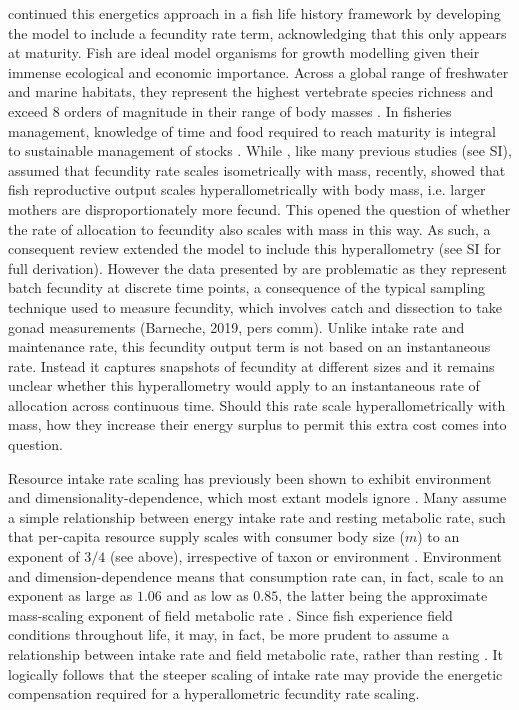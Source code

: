 \documentclass[a4paper]{article} %
\begin{document}
    \textcite{Charnov2001} continued this energetics approach in a fish life history framework by developing the \textcite{West2001} model to include a fecundity rate term, acknowledging that this only appears at maturity. Fish are ideal model organisms for growth modelling given their immense ecological and economic importance. Across a global range of freshwater and marine habitats, they represent the highest vertebrate species richness and exceed 8 orders of magnitude in their range of body masses \autocite{Barneche2018c}. In fisheries management, knowledge of time and food required to reach maturity is integral to sustainable management of stocks \autocite{Szuwalski2017, Barneche2018c}.
    While \textcite{Charnov2001}, like many previous studies (see SI), assumed that fecundity rate scales isometrically with mass, recently, \textcite{Barneche2018-reproductive_output} showed that fish reproductive output scales hyperallometrically with body mass, i.e. larger mothers are disproportionately more fecund. This opened the question of whether the rate of allocation to fecundity also scales with mass in this way. As such, a consequent review extended the \textcite{Charnov2001} model to include this hyperallometry \autocite{Marshall2019b} (see SI for full derivation). However the data presented by \textcite{Barneche2018-reproductive_output} are problematic as they represent batch fecundity at discrete time points, a consequence of the typical sampling technique used to measure fecundity, which involves catch and dissection to take gonad measurements (Barneche, 2019, pers comm). Unlike intake rate and maintenance rate, this fecundity output term is not based on an instantaneous rate. Instead it captures snapshots of fecundity at different sizes and it remains unclear whether this hyperallometry would apply to an instantaneous rate of allocation across continuous time. Should this rate scale hyperallometrically with mass, how they increase their energy surplus to permit this extra cost comes into question.

    Resource intake rate scaling has previously been shown to exhibit environment and dimensionality-dependence, which most extant models ignore \autocite{Pawar2012}. Many assume a simple relationship between energy intake rate and resting metabolic rate, such that per-capita resource supply scales with consumer body size ($m$) to an exponent of $3/4$ (see above), irrespective of taxon or environment \autocite{Pawar2012}. Environment and dimension-dependence means that consumption rate can, in fact, scale to an exponent as large as $1.06$ and as low as $0.85$, the latter being the approximate mass-scaling exponent of field metabolic rate \autocite{peters1983,Weibel2004, Pawar2012}. Since fish experience field conditions throughout life, it may, in fact, be more prudent to assume a relationship between intake rate and field metabolic rate, rather than resting \autocite{Boisclair1993}. It logically follows that the steeper scaling of intake rate may provide the energetic compensation required for a hyperallometric fecundity rate scaling.
\end{document}
